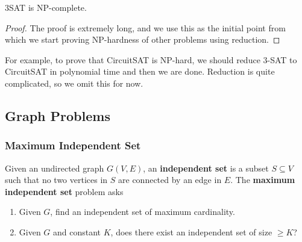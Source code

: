   \begin{theorem}
    3SAT is NP-complete. 
  \end{theorem} 
  \begin{proof}
    The proof is extremely long, and we use this as the initial point from which we start proving NP-hardness of other problems using reduction. 
  \end{proof}

  For example, to prove that CircuitSAT is NP-hard, we should reduce 3-SAT to CircuitSAT in polynomial time and then we are done. Reduction is quite complicated, so we omit this for now. 

\subsection{Graph Problems}

  \subsubsection{Maximum Independent Set}

    \begin{definition}[MIS]
      Given an undirected graph $G(V, E)$, an \textbf{independent set} is a subset $S \subseteq V$ such that no two vertices in $S$ are connected by an edge in $E$. The \textbf{maximum independent set} problem asks 
      \begin{enumerate}
        \item Given $G$, find an independent set of maximum cardinality. 
        \item Given $G$ and constant $K$, does there exist an independent set of size $\geq K$? 
      \end{enumerate}
    \end{definition}

